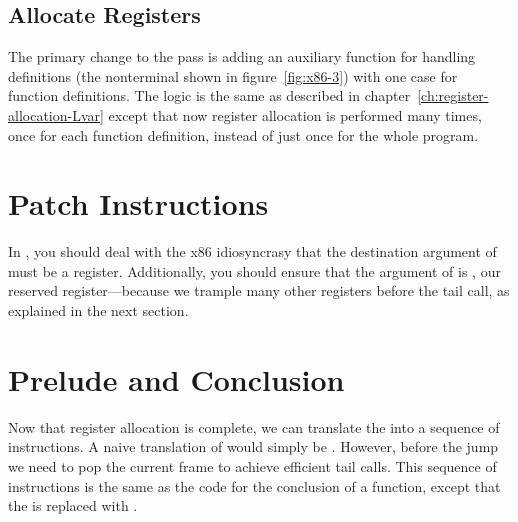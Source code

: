 \documentclass[7x10]{TimesAPriori_MIT}%
\numberwithin{theorem}{chapter}
\numberwithin{definition}{chapter}
\numberwithin{equation}{chapter}
\begin{document}
\subsection{Allocate Registers}

The primary change to the  pass is adding an
auxiliary function for handling definitions (the \Def{} nonterminal
shown in figure~\ref{fig:x86-3}) with one case for function
definitions. The logic is the same as described in
chapter~\ref{ch:register-allocation-Lvar} except that now register
allocation is performed many times, once for each function definition,
instead of just once for the whole program.


\section{Patch Instructions}

In , you should deal with the x86
idiosyncrasy that the destination argument of  must be a
register. Additionally, you should ensure that the argument of
 is , our reserved register---because we
trample many other registers before the tail call, as explained in the
next section.

\section{Prelude and Conclusion}

Now that register allocation is complete, we can translate the
 into a sequence of instructions. A naive translation of
 would simply be .  However,
before the jump we need to pop the current frame to achieve efficient
tail calls.  This sequence of instructions is the same as the code for
the conclusion of a function, except that the  is replaced with
.
\end{document}
